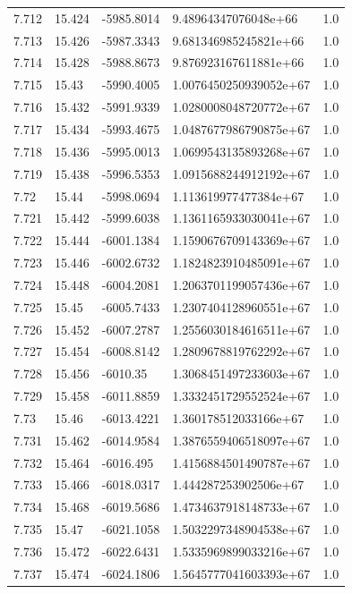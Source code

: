 \begin{tabular}{lllll}
7.712 & 15.424 & -5985.8014 & 9.48964347076048e+66 & 1.0 \\
7.713 & 15.426 & -5987.3343 & 9.681346985245821e+66 & 1.0 \\
7.714 & 15.428 & -5988.8673 & 9.876923167611881e+66 & 1.0 \\
7.715 & 15.43 & -5990.4005 & 1.0076450250939052e+67 & 1.0 \\
7.716 & 15.432 & -5991.9339 & 1.0280008048720772e+67 & 1.0 \\
7.717 & 15.434 & -5993.4675 & 1.0487677986790875e+67 & 1.0 \\
7.718 & 15.436 & -5995.0013 & 1.0699543135893268e+67 & 1.0 \\
7.719 & 15.438 & -5996.5353 & 1.0915688244912192e+67 & 1.0 \\
7.72 & 15.44 & -5998.0694 & 1.113619977477384e+67 & 1.0 \\
7.721 & 15.442 & -5999.6038 & 1.1361165933030041e+67 & 1.0 \\
7.722 & 15.444 & -6001.1384 & 1.1590676709143369e+67 & 1.0 \\
7.723 & 15.446 & -6002.6732 & 1.1824823910485091e+67 & 1.0 \\
7.724 & 15.448 & -6004.2081 & 1.2063701199057436e+67 & 1.0 \\
7.725 & 15.45 & -6005.7433 & 1.2307404128960551e+67 & 1.0 \\
7.726 & 15.452 & -6007.2787 & 1.2556030184616511e+67 & 1.0 \\
7.727 & 15.454 & -6008.8142 & 1.2809678819762292e+67 & 1.0 \\
7.728 & 15.456 & -6010.35 & 1.3068451497233603e+67 & 1.0 \\
7.729 & 15.458 & -6011.8859 & 1.3332451729552524e+67 & 1.0 \\
7.73 & 15.46 & -6013.4221 & 1.360178512033166e+67 & 1.0 \\
7.731 & 15.462 & -6014.9584 & 1.3876559406518097e+67 & 1.0 \\
7.732 & 15.464 & -6016.495 & 1.4156884501490787e+67 & 1.0 \\
7.733 & 15.466 & -6018.0317 & 1.444287253902506e+67 & 1.0 \\
7.734 & 15.468 & -6019.5686 & 1.4734637918148733e+67 & 1.0 \\
7.735 & 15.47 & -6021.1058 & 1.5032297348904538e+67 & 1.0 \\
7.736 & 15.472 & -6022.6431 & 1.5335969899033216e+67 & 1.0 \\
7.737 & 15.474 & -6024.1806 & 1.5645777041603393e+67 & 1.0 \\

\end{tabular}
